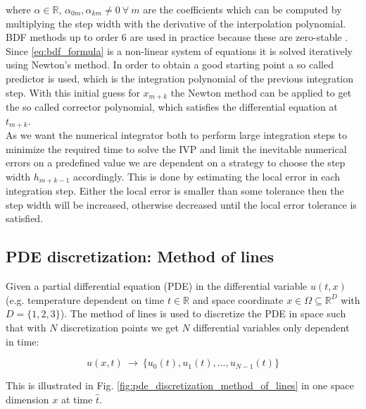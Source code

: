 \documentclass{scrartcl}[12pt, halfparskip]
\begin{document}
where $\alpha \in \mathbb{R}$, $\alpha_{0m},\alpha_{km} \ne 0 \ \forall \ m$ are the coefficients which can be computed by multiplying the step width with the derivative of the interpolation polynomial.  \\
BDF methods up to order 6 are used in practice because these are zero-stable \cite{numerik1_skript_koerkel}. \\
Since \eqref{eq:bdf_formula} is a non-linear system of equations it is solved iteratively using Newton's method. In order to obtain a good starting point a so called predictor is used, which is the integration polynomial of the previous integration step. With this initial guess for $x_{m+k}$ the Newton method can be applied to get the so called corrector polynomial, which satisfies the differential equation at $t_{m+k}$. \\
As we want the numerical integrator both to perform large integration steps to minimize the required time to solve the IVP and limit the inevitable numerical errors on a predefined value we are dependent on a strategy to choose the step width $h_{m+k-1}$ accordingly. This is done by estimating the local error in each integration step. Either the local error is smaller than some tolerance then the step width will be increased, otherwise decreased until the local error tolerance is satisfied. \\







\subsection{PDE discretization: Method of lines}
\label{subsection:pde_discretization}



Given a partial differential equation (PDE) in the differential variable $u(t,x)$ (e.g. temperature dependent on time $t \in \mathbb{R}$ and space coordinate $x \in \Omega \subseteq \mathbb{R}^D$ with $D=\{1,2,3\}$). The method of lines is used to discretize the PDE in space such that with $N$ discretization points we get $N$ differential variables only dependent in time:

\begin{equation}
	u(x,t) \ \rightarrow \ \{ u_0(t), u_1(t), ..., u_{N-1}(t) \}
\end{equation}

This is illustrated in Fig. \ref{fig:pde_discretization_method_of_lines} in one space dimension $x$ at time $\hat{t}$.
\end{document}
